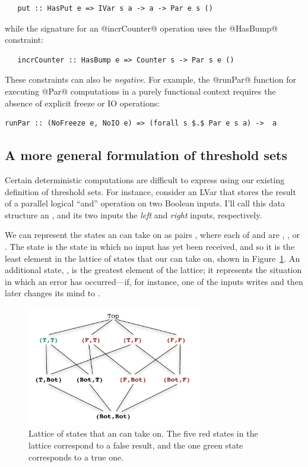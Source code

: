 \begin{lstlisting}
   put :: HasPut e => IVar s a -> a -> Par e s ()
\end{lstlisting}
while the signature for an @incrCounter@ operation uses the
@HasBump@ constraint:
\begin{lstlisting}
   incrCounter :: HasBump e => Counter s -> Par s e ()
\end{lstlisting}
These constraints can also be \emph{negative}.  For example, the
@runPar@ function for executing @Par@ computations in a purely
functional context requires the absence of explicit freeze or IO
operations:
\begin{lstlisting}[mathescape=true]
runPar :: (NoFreeze e, NoIO e) => (forall s $.$ Par e s a) ->  a 
\end{lstlisting}

\subsection{A more general formulation of threshold sets}\label{subsection:lvars-a-more-general-formulation-of-threshold-sets}

Certain deterministic computations are difficult to express using our
existing definition of threshold sets.  For instance, consider an LVar
that stores the result of a parallel logical ``and'' operation on two
Boolean inputs.  I'll call this data structure an \emph{},
and its two inputs the \emph{left} and \emph{right} inputs,
respectively.

We can represent the states an  can take on as pairs
, where each of  and  are , , or
.  The  state is the state in which no input has
yet been received, and so it is the least element in the lattice of
states that our  can take on, shown in
Figure~\ref{f:lvars-parallel-and}.  An additional state, , is
the greatest element of the lattice; it represents the situation in
which an error has occurred---if, for instance, one of the inputs
writes  and then later changes its mind to .

\begin{figure}
\begin{center}
  \includegraphics[width=3in]{chapter2/figures/lvars-parallel-and.pdf}
\end{center}
  \caption{Lattice of states that an  can take on.  The five
    red states in the lattice correspond to a false result, and the
    one green state corresponds to a true one.}
  \label{f:lvars-parallel-and}
\end{figure}

